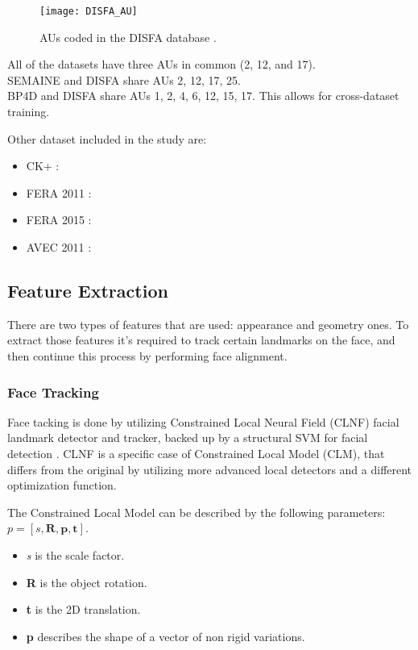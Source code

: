 \begin{figure}[H]
	\centering
	\texttt{[image: DISFA\_AU]}
	\caption{AUs coded in the DISFA database \cite{DISFA_AU}.}
	\label{fig:DISFA_AU}
\end{figure}

All of the datasets have three AUs in common (2, 12, and 17). \\
SEMAINE and DISFA share AUs 2, 12, 17, 25. \\
BP4D and DISFA share AUs 1, 2, 4, 6, 12, 15, 17. This allows for cross-dataset training.

Other dataset included in the study are:
\begin{itemize}[noitemsep]
	\item CK+ \cite{CK+}: 
	\item FERA 2011 \cite{FERA11}:
	\item FERA 2015 \cite{FERA15}:
	\item AVEC 2011 \cite{AVEC11}:
\end{itemize}


\subsection{Feature Extraction}
There are two types of features that are used: appearance and geometry ones. To extract those features it's required to track certain landmarks on the face, and then continue this process by performing face alignment.

\subsubsection{Face Tracking}
Face tacking is done by utilizing Constrained Local Neural Field (CLNF) facial landmark detector and tracker, backed up by a structural SVM for facial detection \cite{Baltru2013}.
CLNF is a specific case of Constrained Local Model (CLM), that differs from the original by utilizing more advanced local detectors and a different optimization function.

The Constrained Local Model can be described by the following parameters: \\
$p = [s, \mathbf{R}, \mathbf{p}, \mathbf{t}]$.
\begin{itemize}[noitemsep, topsep = -5pt]
	\item \textit{s} is the scale factor.
	\item \textbf{R} is the object rotation.
	\item \textbf{t} is the 2D translation.
	\item \textbf{p} describes the shape of a vector of non rigid variations.
\end{itemize}

